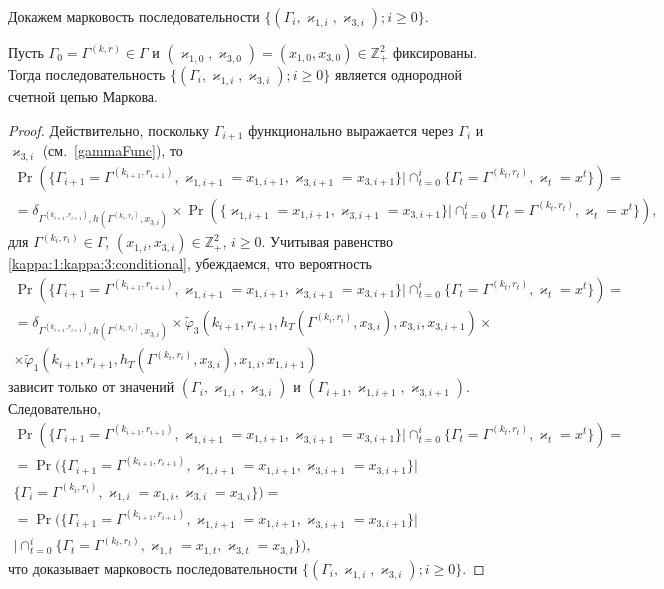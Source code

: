 \documentclass[a4paper,12pt,russian]{extarticle}
\begin{document}
Докажем марковость последовательности $\{(\Gamma_i, \varkappa_{1,i},\varkappa_{3,i}); i \geqslant 0\}$.
\begin{theorem}
Пусть $\Gamma_0=\Gamma^{(k,r)}\in \Gamma$ и $(\varkappa_{1,0}, \varkappa_{3,0})=(x_{1,0}, x_{3,0})\in \mathbb{Z}_+^2$ фиксированы. Тогда последовательность $\{(\Gamma_i, \varkappa_{1,i},\varkappa_{3,i}); i \geqslant 0\}$ является однородной счетной цепью Маркова.
\end{theorem}
\begin{proof}
Действительно, поскольку $\Gamma_{i+1}$ функционально выражается через $\Gamma_i$ и $\varkappa_{3,i}$ (см.~\eqref{gammaFunc}), то
\begin{multline*}
\Pr (\{ \Gamma_{i+1} =\Gamma^{(k_{i+1},r_{i+1})},\varkappa_{1,i+1} = x_{1,i+1},\varkappa_{3,i+1} = x_{3,i+1}\} |\cap_{t=0}^{i}\{ \Gamma_t=\Gamma^{(k_t,r_t)}, \varkappa_t=x^t\})=\\
=\delta_{\Gamma^{(k_{i+1},r_{i+1})},h(\Gamma^{(k_i,r_i)},x_{3,i})}\times \Pr (\{ \varkappa_{1,i+1} = x_{1,i+1},  \varkappa_{3,i+1} = x_{3,i+1}\} |\cap_{t=0}^{i}\{ \Gamma_t=\Gamma^{(k_t,r_t)}, \varkappa_t=x^t\}),
\end{multline*}
для $\Gamma^{(k_i,r_i)}\in \Gamma$, $(x_{1,i}, x_{3,i})\in {\mathbb Z}_+^2$, $i\geqslant 0$. Учитывая равенство \eqref{kappa:1:kappa:3:conditional}, убеждаемся, что вероятность 
\begin{multline*}
\Pr (\{ \Gamma_{i+1} =\Gamma^{(k_{i+1},r_{i+1})},\varkappa_{1,i+1} = x_{1,i+1},\varkappa_{3,i+1} = x_{3,i+1}\} |\cap_{t=0}^{i}\{\Gamma_t=\Gamma^{(k_t,r_t)}, \varkappa_t=x^t\}) = \\
=\delta_{\Gamma^{(k_{i+1},r_{i+1})},h(\Gamma^{(k_i,r_i)},x_{3,i})} \times \widetilde{\varphi}_3(k_{i+1},r_{i+1},h_T(\Gamma^{(k_i,r_i)},x_{3,i}),x_{3,i},x_{3,i+1})
\times \\ \times \widetilde{\varphi}_1(k_{i+1},r_{i+1},h_T(\Gamma^{(k_i,r_i)},x_{3,i}),x_{1,i},x_{1,i+1})
\end{multline*}
зависит только от значений $(\Gamma_i,\varkappa_{1,i},\varkappa_{3,i})$ и $(\Gamma_{i+1},\varkappa_{1,i+1}, \varkappa_{3,i+1})$. Следовательно, 
\begin{multline*}
\Pr (\{ \Gamma_{i+1} =\Gamma^{(k_{i+1},r_{i+1})},\varkappa_{1,i+1} = x_{1,i+1},\varkappa_{3,i+1} = x_{3,i+1}\} |\cap_{t=0}^{i}\{\Gamma_t=\Gamma^{(k_t,r_t)}, \varkappa_t=x^t\})=\\
=\Pr (\{  \Gamma_{i+1} =\Gamma^{(k_{i+1},r_{i+1})},\varkappa_{1,i+1} = x_{1,i+1},\varkappa_{3,i+1} = x_{3,i+1}\} | \\ \{ \Gamma_i=\Gamma^{(k_i,r_i)},\varkappa_{1,i}=x_{1,i}, \varkappa_{3,i}=x_{3,i}\}) = \\
=\Pr (\{ \Gamma_{i+1} =\Gamma^{(k_{i+1},r_{i+1})}, \varkappa_{1,i+1} = x_{1,i+1},\varkappa_{3,i+1} = x_{3,i+1}\} |\\ |\cap_{t=0}^{i}\{ \Gamma_t=\Gamma^{(k_t,r_t)}, \varkappa_{1,t}=x_{1,t}, \varkappa_{3,t}=x_{3,t}\}),
\end{multline*}
что доказывает марковость последовательности $\{(\Gamma_i, \varkappa_{1,i},\varkappa_{3,i}); i \geqslant 0\}$.
\end{proof}
\end{document}
